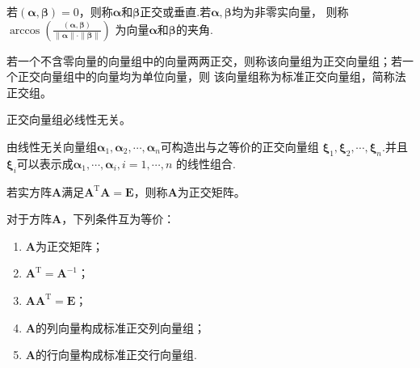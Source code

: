 \begin{definition}
    若$(\boldsymbol{\alpha},\boldsymbol{\beta})=0$，则称$\boldsymbol{\alpha}$和$\boldsymbol{\beta}${\heiti 正交}或{\heiti 垂直}.若$\boldsymbol{\alpha},\boldsymbol{\beta}$均为非零实向量，
    则称$\displaystyle{\arccos\left(\frac{(\boldsymbol{\alpha},\boldsymbol{\beta})}{\|\boldsymbol{\alpha}\|\cdot\|\boldsymbol{\beta}\|}\right)}$
    为向量$\boldsymbol{\alpha}$和$\boldsymbol{\beta}$的{\heiti 夹角}.
\end{definition}

\begin{definition}
    若一个不含零向量的向量组中的向量两两正交，则称该向量组为{\heiti 正交向量组}；若一个正交向量组中的向量均为单位向量，则
    该向量组称为{\heiti 标准正交向量组}，简称{\heiti 法正交组}。
\end{definition}

\begin{theorem}
    正交向量组必线性无关。
\end{theorem}

\begin{theorem}
    由线性无关向量组$\boldsymbol{\alpha}_1,\boldsymbol{\alpha}_2,\cdots,\boldsymbol{\alpha}_n$可构造出与之等价的正交向量组
    $\boldsymbol{\xi }_1,\boldsymbol{\xi}_2,\cdots,\boldsymbol{\xi}_n$.并且$\boldsymbol{\xi}_i$可以表示成$\boldsymbol{\alpha}_1,\cdots,\boldsymbol{\alpha}_i,i=1,\cdots,n$
    的线性组合.
\end{theorem}

\begin{definition}[正交矩阵]
    若实方阵$\boldsymbol{A}$满足$\boldsymbol{A}^\mathrm{T}\boldsymbol{A}=\boldsymbol{E}$，则称$\boldsymbol{A}$为{\heiti 正交矩阵}。
\end{definition}

\begin{theorem}
    对于方阵$\boldsymbol{A}$，下列条件互为等价：
    \begin{enumerate}[(1)]
        \item $\boldsymbol{A}$为正交矩阵；
        \item $\boldsymbol{A}^\mathrm{T}=\boldsymbol{A}^{-1}$；
        \item $\boldsymbol{A}\boldsymbol{A}^\mathrm{T}=\boldsymbol{E}$；
        \item $\boldsymbol{A}$的列向量构成标准正交列向量组；
        \item $\boldsymbol{A}$的行向量构成标准正交行向量组.
    \end{enumerate}
\end{theorem}

